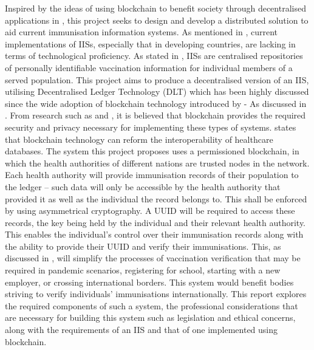 Inspired by the ideas of using blockchain to benefit society
through decentralised applications in \cite{huckle_internet_2016}, this project seeks to
design and develop a distributed solution to aid current
immunisation information systems. As mentioned in \cite{world_health_organization_better_immunization_information_systemspdf_2013},
current implementations of IISs, especially that in developing
countries, are lacking in terms of technological proficiency.
As stated in \cite{noauthor_digital_nodate}, IISs are centralised repositories of personally
identifiable vaccination information for individual members of
a served population. This project aims to produce a
decentralised version of an IIS, utilising Decentralised Ledger Technology (DLT) 
which has been highly discussed since the wide adoption of blockchain technology introduced by \cite{nakamoto_bitcoin_2019} - As discussed in \cite{sunyaev_distributed_2020}.
From research such as \cite{elisa_framework_2018} and \cite{tanwar_blockchain_based_2020}, it is believed that blockchain provides the
required security and privacy necessary for implementing
these types of systems. \cite{tanwar_blockchain_based_2020} states that blockchain technology
can reform the interoperability of healthcare databases.
The system this project proposes uses a permissioned
blockchain, in which the health authorities of different nations
are trusted nodes in the network. Each health authority will
provide immunisation records of their population to the ledger
– such data will only be accessible by the health authority that
provided it as well as the individual the record belongs to.
This shall be enforced by using asymmetrical cryptography. A
UUID will be required to access these records, the key
being held by the individual and their relevant health
authority. This enables the individual’s control over their
immunisation records along with the ability to provide their
UUID and verify their immunisations. This, as discussed
in \cite{noauthor_digital_nodate}, will simplify the processes of vaccination verification
that may be required in pandemic scenarios, registering for
school, starting with a new employer, or crossing international
borders. This system would benefit bodies striving to verify
individuals’ immunisations internationally.
This report explores the required components of such a
system, the professional considerations that are necessary for
building this system such as legislation and ethical concerns,
along with the requirements of an IIS and that of one
implemented using blockchain.\linebreak[1]

